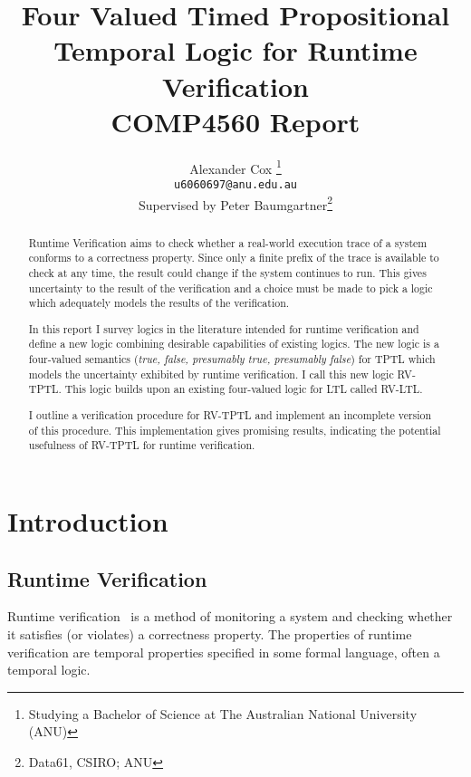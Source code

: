 \documentclass[a4paper]{article}
\title{
  Four Valued Timed Propositional Temporal Logic for Runtime Verification\\
  \normalsize{} COMP4560 Report
}
\author{
  Alexander Cox
  \thanks{Studying a Bachelor of Science at The Australian National University (ANU)}\\
  \small\texttt{u6060697@anu.edu.au}\\
  \normalsize{}Supervised by Peter Baumgartner\thanks{Data61, CSIRO\@; ANU}
}
\begin{document}
\lstset{language=Scala,basicstyle=\ttfamily\small,showstringspaces=false,frame=tl,framerule=1pt,captionpos=b}
\maketitle

\begin{abstract}
  Runtime Verification aims to check whether a real-world execution trace of a system conforms to a correctness property. Since only a finite prefix of the trace is available to check at any time, the result could change if the system continues to run. This gives uncertainty to the result of the verification and a choice must be made to pick a logic which adequately models the results of the verification.

  In this report I survey logics in the literature intended for runtime verification and define a new logic combining desirable capabilities of existing logics.
  The new logic is a four-valued semantics (\emph{true, false, presumably true, presumably false}) for TPTL which models the uncertainty exhibited by runtime verification. I call this new logic RV-TPTL. This logic builds upon an existing four-valued logic for LTL called RV-LTL.

  I outline a verification procedure for RV-TPTL and implement an incomplete version of this procedure. This implementation gives promising results, indicating the potential usefulness of RV-TPTL for runtime verification.
\end{abstract}
\newpage
\tableofcontents
\newpage

\section{Introduction}
\subsection{Runtime Verification}
Runtime verification~\autocite{colin2005rv} is a method of monitoring a system and checking whether it satisfies (or violates) a correctness property.
The properties of runtime verification are temporal properties specified in some formal language, often a temporal logic.
\end{document}
